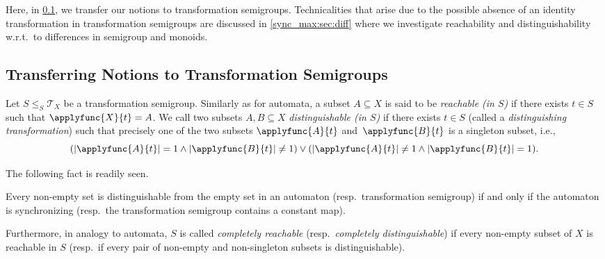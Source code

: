 
Here, in \cref{sync_max:sec:transfer}, we transfer our notions to transformation semigroups. 
Technicalities that arise due to the possible absence of an identity transformation
in transformation semigroups are discussed in \cref{sync_max:sec:diff}
where we investigate reachability and distinguishability 
w.r.t.~to differences in semigroup and monoids.

\subsection{Transferring Notions to Transformation Semigroups}
\label{sync_max:sec:transfer} 


Let $S \le_S \mathcal T_X$ be a transformation semigroup.
Similarly as for automata,  
a subset $A \subseteq X$ is said to be \emph{reachable (in $S$)} if there 
exists $t \in S$ such that $\applyfunc{X}{t} = A$.
We call two subsets $A, B \subseteq X$ \emph{distinguishable (in $S$)}
if there exists $t \in S$ (called a \emph{distinguishing transformation}) such that precisely one of the two 
subsets $\applyfunc{A}{t}$ and~$\applyfunc{B}{t}$
is a singleton subset, 
i.e.,
\[
( |\applyfunc{A}{t}| = 1 \land |\applyfunc{B}{t}| \ne 1 )
\lor 
( |\applyfunc{A}{t}| \ne 1 \land |\applyfunc{B}{t}| = 1 ).
\]

The following fact is readily seen.

\begin{proposition} \label{sync_max:prop:emptyset_dist_iff_sync}
	Every non-empty set is distinguishable from the empty set in an automaton (resp.~transformation semigroup)
	if and only if 
	the automaton is synchronizing (resp.~the transformation semigroup contains a constant map). 
\end{proposition} 

 
Furthermore, in analogy to automata, $S$ is called \emph{completely reachable} (resp.~\emph{completely distinguishable})
if every non-empty subset of $X$ is reachable in $S$
(resp.~if every pair of non-empty and non-singleton subsets is distinguishable).


